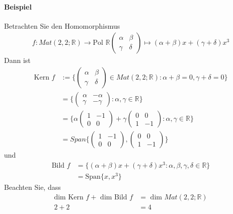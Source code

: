 \documentclass[11pt]{report}
\newcommand*\Zb[1] {\mathbb{#1}}
\begin{document}
\paragraph{Beispiel}
Betrachten Sie den Homomorphismus 
\begin{align}
 f: Mat(2,2;\Zb{R}) \rightarrow \text{Pol }\Zb{R} 
 \begin{pmatrix} \alpha & \beta \\ \gamma & \delta \end{pmatrix} \mapsto (\alpha+\beta)x + (\gamma + \delta) x^3
\end{align}
Dann ist
\begin{align}
 \text{Kern } f &:= \{\begin{pmatrix} \alpha & \beta \\ \gamma & \delta \end{pmatrix} \in Mat(2,2;\Zb{R}): \alpha+\beta=0, \gamma+\delta = 0\} \\
 &= \{\begin{pmatrix} \alpha & -\alpha \\ \gamma & -\gamma \end{pmatrix}: \alpha, \gamma \in \Zb{R}\}\\
 &= \{\alpha\begin{pmatrix} 1 & -1 \\ 0 & 0 \end{pmatrix} + \gamma \begin{pmatrix} 0 & 0 \\ 1 & -1 \end{pmatrix}: \alpha, \gamma \in \Zb{R}\}\\
 &= Span\{\begin{pmatrix} 1 & -1 \\ 0 & 0 \end{pmatrix}, \begin{pmatrix} 0 & 0 \\ 1 & -1 \end{pmatrix}\}
\end{align}
und 
\begin{align}
 \text{Bild } f &= \{(\alpha+ \beta)x + (\gamma + \delta) x^3: \alpha, \beta, \gamma, \delta \in \Zb{R}\} \\
 &= \text{Span}\{x,x^3\}
\end{align}
Beachten Sie, dass
\begin{align}
 \text{dim Kern } f +  \text{ dim Bild } f &=  \text{ dim } Mat(2,2;\Zb{R}) \\
2 + 2 &= 4
\end{align}
\end{document}
